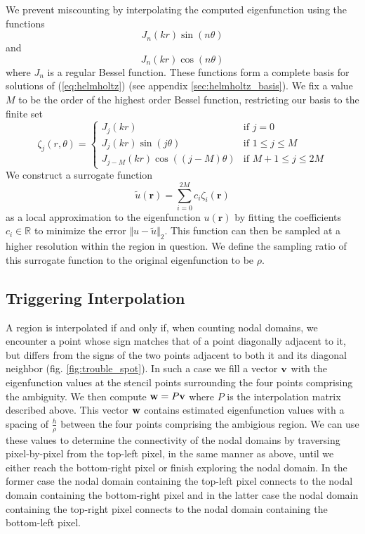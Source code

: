 \documentclass{report}
\newcommand{\rr}[0]{\mathbf{r}}
\begin{document}
We prevent miscounting by interpolating the computed eigenfunction using the functions
\[
J_{n}(k r) \sin(n \theta)
\]
and
\[
J_{n}(k r) \cos(n \theta)
\]
where $J_{n}$ is a regular Bessel function. These functions form a complete basis for solutions of (\ref{eq:helmholtz}) (see appendix \ref{sec:helmholtz_basis}). We fix a value $M$ to be the order of the highest order Bessel function, restricting our basis to the finite set
\begin{equation}
  \label{eq:interp_functions}
  \zeta_{j}(r, \theta)=\begin{cases}
  J_{j}(k r) & \text{if }j=0\\
  J_{j}(k r)\sin(j\theta) & \text{if }1 \le j \le M\\
  J_{j-M}(k r)\cos((j-M)\theta) & \text{if }M+1 \le j \le 2M
  \end{cases}
\end{equation}
We construct a surrogate function
\[
  \tilde{u}(\rr) = \sum_{i=0}^{2M} c_{i} \zeta_{i}(\rr)
\]
as a local approximation to the eigenfunction $u(\rr)$ by fitting the coefficients $c_{i} \in \mathbb{R}$ to minimize the error $\Vert u - \tilde{u} \Vert_{2}$. This function can then be sampled at a higher resolution within the region in question. We define the sampling ratio of this surrogate function to the original eigenfunction to be $\rho$.

\subsection{Triggering Interpolation}
A region is interpolated if and only if, when counting nodal domains, we encounter a point whose sign matches that of a point diagonally adjacent to it, but differs from the signs of the two points adjacent to both it and its diagonal neighbor (fig. \ref{fig:trouble_spot}). In such a case we fill a vector ${\bf v}$ with the eigenfunction values at the stencil points surrounding the four points comprising the ambiguity. We then compute ${\bf w} = P {\bf v}$ where $P$ is the interpolation matrix described above. This vector ${\bf w}$ contains estimated eigenfunction values with a spacing of $\frac{h}{\rho}$ between the four points comprising the ambigious region. We can use these values to determine the connectivity of the nodal domains by traversing pixel-by-pixel from the top-left pixel, in the same manner as above, until we either reach the bottom-right pixel or finish exploring the nodal domain. In the former case the nodal domain containing the top-left pixel connects to the nodal domain containing the bottom-right pixel and in the latter case the nodal domain containing the top-right pixel connects to the nodal domain containing the bottom-left pixel.
\end{document}

